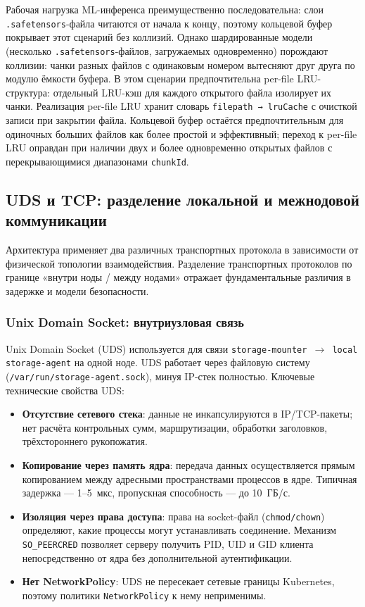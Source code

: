  Рабочая нагрузка ML-инференса преимущественно последовательна: слои \texttt{.safetensors}-файла читаются от начала к концу, поэтому кольцевой буфер покрывает этот сценарий без коллизий. Однако шардированные модели (несколько \texttt{.safetensors}-файлов, загружаемых одновременно) порождают коллизии: чанки разных файлов с одинаковым номером вытесняют друг друга по модулю ёмкости буфера. В этом сценарии предпочтительна per-file LRU-структура: отдельный LRU-кэш для каждого открытого файла изолирует их чанки. Реализация per-file LRU хранит словарь \texttt{filepath → lruCache} с очисткой записи при закрытии файла. Кольцевой буфер остаётся предпочтительным для одиночных больших файлов как более простой и эффективный; переход к per-file LRU оправдан при наличии двух и более одновременно открытых файлов с перекрывающимися диапазонами \texttt{chunkId}.

\subsection{UDS и TCP: разделение локальной и межнодовой коммуникации}

Архитектура применяет два различных транспортных протокола в зависимости от физической топологии взаимодействия. Разделение транспортных протоколов по границе «внутри ноды / между нодами» отражает фундаментальные различия в задержке и модели безопасности.

\subsubsection{Unix Domain Socket: внутриузловая связь}

Unix Domain Socket (UDS) используется для связи \texttt{storage-mounter $\to$ local storage-agent} на одной ноде. UDS работает через файловую систему (\texttt{/var/run/storage-agent.sock}), минуя IP-стек полностью. Ключевые технические свойства UDS:

\begin{itemize}[leftmargin=*]
  \item \textbf{Отсутствие сетевого стека}: данные не инкапсулируются в IP/TCP-пакеты; нет расчёта контрольных сумм, маршрутизации, обработки заголовков, трёхстороннего рукопожатия.
  \item \textbf{Копирование через память ядра}: передача данных осуществляется прямым копированием между адресными пространствами процессов в ядре. Типичная задержка --- 1--5~мкс, пропускная способность --- до 10~ГБ/с.
  \item \textbf{Изоляция через права доступа}: права на socket-файл (\texttt{chmod/chown}) определяют, какие процессы могут устанавливать соединение. Механизм \texttt{SO\_PEERCRED} позволяет серверу получить PID, UID и GID клиента непосредственно от ядра без дополнительной аутентификации.
  \item \textbf{Нет NetworkPolicy}: UDS не пересекает сетевые границы Kubernetes, поэтому политики \texttt{NetworkPolicy} к нему неприменимы.
\end{itemize}

